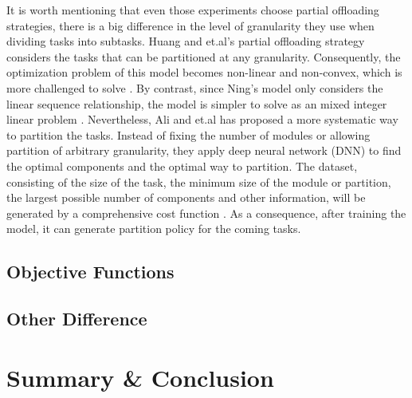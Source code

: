 \documentclass[a4paper,11pt]{article}
\begin{document}
It is worth mentioning that even those experiments choose partial offloading strategies, there is a big difference in the level of granularity they use when dividing tasks into subtasks. %
Huang and et.al's partial offloading strategy considers the tasks that can be partitioned at any granularity. Consequently, the optimization problem of this model becomes non-linear and non-convex, which is more challenged to solve \cite{Distributed_Offloading_in_Overlapping_Areas}. By contrast, since Ning's model only considers the linear sequence relationship, the model is simpler to solve as an mixed integer linear problem \cite{A_Cooperative_Partial_Computation_Offloading_Scheme_for_Mobile_Edge}. Nevertheless, Ali and et.al has proposed a more systematic way to partition the tasks. Instead of fixing the number of modules or allowing partition of arbitrary granularity, they apply deep neural network (DNN) to find the optimal components and the optimal way to partition. The dataset, consisting of the size of the task, the minimum size of the module or partition, the largest possible number of components and other information, will be generated by a comprehensive cost function \cite{granuity_2}. As a consequence, after training the model, it can generate partition policy for the coming tasks.

%


\subsection{Objective Functions}
\subsection{Other Difference}


\section{Summary \& Conclusion}
\end{document}
